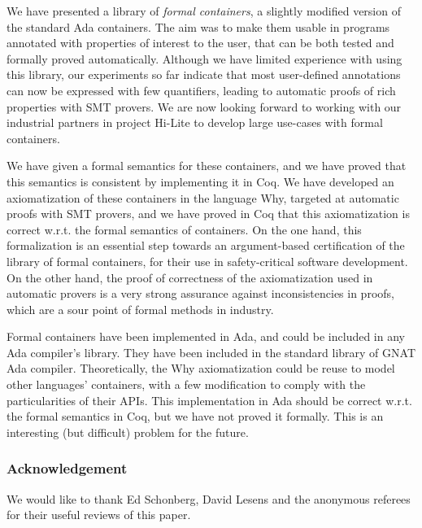 \documentclass[runningheads,a4paper]{llncs}
\newcommand{\wrt}{w.r.t.\xspace}
\newcommand{\beforesec}{\vspace{-0.2cm}}
\begin{document}
We have presented a library of \textit{formal containers}, a slightly modified
version of the standard Ada containers. The aim was to make them usable in
programs annotated with properties of interest to the user, that can be both
tested and formally proved automatically.  Although we have limited experience
with using this library, our experiments so far indicate that most user-defined
annotations can now be expressed with few quantifiers, leading to automatic proofs of
rich properties with SMT provers. We are now looking forward to working
with our industrial partners in project Hi-Lite to develop large use-cases with
formal containers.

We have given a formal semantics for these containers, and we have proved that
this semantics is consistent by implementing it in Coq. We have developed an
axiomatization of these containers in the language Why, targeted at automatic
proofs with SMT provers, and we have proved in Coq that this axiomatization is
correct \wrt the formal semantics of containers. On the one hand, this
formalization is an essential step towards an argument-based certification of
the library of formal containers, for their use in safety-critical software
development. On the other hand, the proof of correctness of the axiomatization
used in automatic provers is a very strong assurance against inconsistencies in
proofs, which are a sour point of formal methods in industry.

Formal containers have been implemented in Ada, and could be included in any Ada
compiler's library.
They have been included in the standard library of GNAT Ada compiler.
Theoretically, the Why axiomatization could be reuse to model other languages'
containers, with a few modification to comply with the particularities of
their APIs.
%
This implementation in Ada should be correct \wrt the formal
semantics in Coq, but we have not proved it formally. This is an interesting
(but difficult) problem for the future.

\subsubsection*{Acknowledgement}
We would like to thank Ed Schonberg, David Lesens and the anonymous referees for
their useful reviews of this paper.

\beforesec




\end{document}
